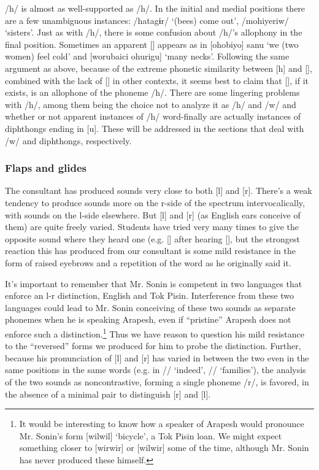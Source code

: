 \documentclass[pdftex,12pt,letterpaper]{article}
\let\ipa\textipa
\def\sw{\ipa{\super w}}
\begin{document}
 /h\sw/ is almost as well-supported as /h/. In the initial and medial positions there are a few unambiguous instances: /h\sw atagɨr/ `(bees) come out', /moh\sw iyeriw/ `sisters'. Just as with /h/, there is some confusion about /h\sw/'s allophony in the final position. Sometimes an apparent [\ipa{F}] appears as in [ohobiyo\ipa{F}] \ipa{\textltailn uman@g@s} sanu\ipa{F} `we (two women) feel cold' and [worubaici ohurigu\ipa{F}] `many necks'. Following the same argument as above, because of the extreme phonetic similarity between [h\sw] and [\ipa{F}], combined with the lack of [\ipa{F}] in other contexts, it seems best to claim that [\ipa{F}], if it exists, is an allophone of the phoneme /h\sw/. There are some lingering problems with /h\sw/, among them being the choice not to analyze it as /h/ and /w/ and whether or not apparent instances of /h\sw/ word-finally are actually instances of diphthongs ending in [u]. These will be addressed in the sections that deal with /w/ and diphthongs, respectively. 

 \subsubsection{Flaps and glides}

 The consultant has produced sounds very close to both {[l]} and {[r]}. There's a weak tendency to produce sounds more on the r-side of the spectrum intervocalically, with sounds on the l-side elsewhere. But {[l]} and {[r]} (as English ears conceive of them) are quite freely varied. Students have tried very many times to give the opposite sound where they heard one (e.g. {[\ipa{@lmatok}]} after hearing {[\ipa{@rmatok}]}, but the strongest reaction this has produced from our consultant is some mild resistance in the form of raised eyebrows and a repetition of the word as he originally said it.

 It's important to remember that Mr. Sonin is competent in two languages that enforce an l-r distinction, English and Tok Pisin. Interference from these two languages could lead to Mr. Sonin conceiving of these two sounds as separate phonemes when he is speaking Arapesh, even if ``pristine'' Arapesh does not enforce such a distinction.\footnote{It would be interesting to know how a speaker of Arapesh would pronounce Mr. Sonin's form [wilwil] `bicycle', a Tok Pisin loan. We might expect something closer to [wirwir] or [wilwir] some of the time, although Mr. Sonin has never produced these himself.} Thus we have reason to question his mild resistance to the ``reversed'' forms we produced for him to probe the distinction. Further, because his pronunciation of {[l]} and {[r]} has varied in between the two even in the same positions in the same words (e.g. in /\ipa{@d1r}/ `indeed', /\ipa{n1r1g@s}/ `families'), the analysis of the two sounds as noncontrastive, forming a single phoneme /r/, is favored, in the absence of a minimal pair to distinguish {[r]} and {[l]}.
\end{document}
